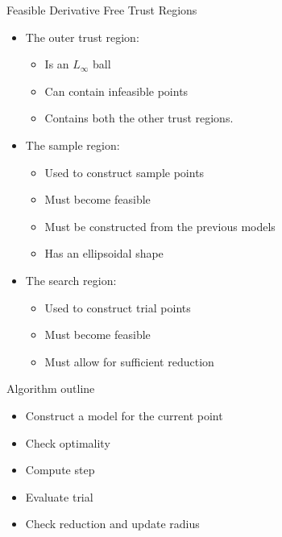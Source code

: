 \documentclass{beamer}
\begin{document}
\begin{frame}{Feasible Derivative Free Trust Regions}
	\begin{itemize}
		\item The outer trust region:
			\begin{itemize}
				\item Is an $L_{\infty}$ ball
				\item Can contain infeasible points
				\item Contains both the other trust regions.
			\end{itemize}
		\item The sample region:
			\begin{itemize}
				\item Used to construct sample points
				\item Must become feasible
				\item Must be constructed from the previous models
				\item Has an ellipsoidal shape
			\end{itemize}
		\item The search region:
			\begin{itemize}
				\item Used to construct trial points
				\item Must become feasible
				\item Must allow for sufficient reduction
			\end{itemize}
	\end{itemize}
\end{frame}


\begin{frame}{Algorithm outline}
	\begin{itemize}
		\item Construct a model for the current point
		\item Check optimality
		\item Compute step
		\item Evaluate trial
		\item Check reduction and update radius
	\end{itemize}
\end{frame}
\end{document}
